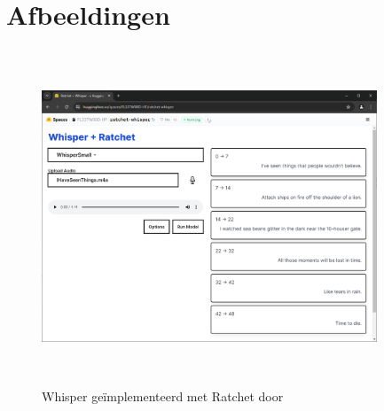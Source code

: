 \documentclass[dutch,dit,thesis]{hogentreport}
\begin{document}


%


\backmatter{}

\setlength\bibitemsep{2pt} %
\printbibliography[heading=bibintoc]

\chapter{Afbeeldingen}
\begin{figure}
    \centering
    \captionsetup{justification=centering}
    \includegraphics[width=10cm,height=10cm,keepaspectratio]{WhisperRatchetWin.PNG}
    \caption[Whisper + Ratchet~\autocite{Fleetwood2024}]{
        Whisper geïmplementeerd met Ratchet door \textcite{Fleetwood2024}
    }
    \label{fig:Whisper + Ratchet}
\end{figure}
\end{document}
